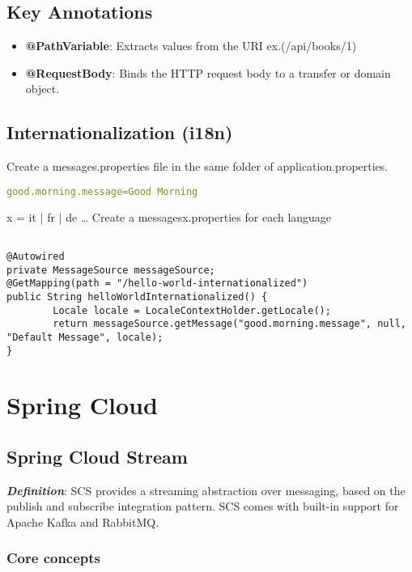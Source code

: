 \documentclass[a4paper, 12pt]{article}
\begin{document}
    \subsection{Key Annotations}
    \begin{itemize}
        \item \textbf{@PathVariable}: Extracts values from the URI ex.(/api/books/1)
        \item \textbf{@RequestBody}: Binds the HTTP request body to a transfer or domain object.
    \end{itemize}

    \subsection{Internationalization (i18n)}
    Create a messages.properties file in the same folder of application.properties.
    \begin{lstlisting}[language=yaml]
good.morning.message=Good Morning
    \end{lstlisting}

    x = it | fr | de …
    Create a messages{x}.properties for each language

    \begin{lstlisting}

@Autowired
private MessageSource messageSource;
@GetMapping(path = "/hello-world-internationalized")
public String helloWorldInternationalized() {
        Locale locale = LocaleContextHolder.getLocale();
        return messageSource.getMessage("good.morning.message", null, "Default Message", locale);
}
    \end{lstlisting}


    \newpage


    \section{Spring Cloud}

    \subsection{Spring Cloud Stream}

    \textit{\textbf{Definition}}: SCS provides a streaming abstraction over messaging, based on the publish and subscribe integration pattern. SCS comes with built-in support for Apache Kafka and RabbitMQ.

    \subsubsection{Core concepts}
\end{document}
